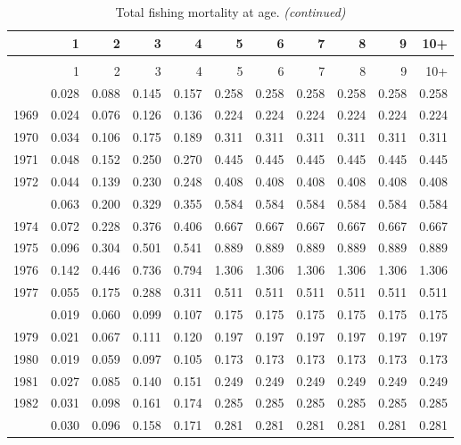 \documentclass[
]{article}
\begin{document}
\begin{longtable}[t]{lrrrrrrrrrr}
\caption{\label{tab:FAA-tot-table}Total fishing mortality at age.}\\
\toprule
  & 1 & 2 & 3 & 4 & 5 & 6 & 7 & 8 & 9 & 10+\\
\midrule
\endfirsthead
\caption[]{Total fishing mortality at age. \textit{(continued)}}\\
\toprule
  & 1 & 2 & 3 & 4 & 5 & 6 & 7 & 8 & 9 & 10+\\
\midrule
\endhead

\endfoot
\bottomrule
\endlastfoot
1968 & 0.028 & 0.088 & 0.145 & 0.157 & 0.258 & 0.258 & 0.258 & 0.258 & 0.258 & 0.258\\
1969 & 0.024 & 0.076 & 0.126 & 0.136 & 0.224 & 0.224 & 0.224 & 0.224 & 0.224 & 0.224\\
1970 & 0.034 & 0.106 & 0.175 & 0.189 & 0.311 & 0.311 & 0.311 & 0.311 & 0.311 & 0.311\\
1971 & 0.048 & 0.152 & 0.250 & 0.270 & 0.445 & 0.445 & 0.445 & 0.445 & 0.445 & 0.445\\
1972 & 0.044 & 0.139 & 0.230 & 0.248 & 0.408 & 0.408 & 0.408 & 0.408 & 0.408 & 0.408\\
\addlinespace
1973 & 0.063 & 0.200 & 0.329 & 0.355 & 0.584 & 0.584 & 0.584 & 0.584 & 0.584 & 0.584\\
1974 & 0.072 & 0.228 & 0.376 & 0.406 & 0.667 & 0.667 & 0.667 & 0.667 & 0.667 & 0.667\\
1975 & 0.096 & 0.304 & 0.501 & 0.541 & 0.889 & 0.889 & 0.889 & 0.889 & 0.889 & 0.889\\
1976 & 0.142 & 0.446 & 0.736 & 0.794 & 1.306 & 1.306 & 1.306 & 1.306 & 1.306 & 1.306\\
1977 & 0.055 & 0.175 & 0.288 & 0.311 & 0.511 & 0.511 & 0.511 & 0.511 & 0.511 & 0.511\\
\addlinespace
1978 & 0.019 & 0.060 & 0.099 & 0.107 & 0.175 & 0.175 & 0.175 & 0.175 & 0.175 & 0.175\\
1979 & 0.021 & 0.067 & 0.111 & 0.120 & 0.197 & 0.197 & 0.197 & 0.197 & 0.197 & 0.197\\
1980 & 0.019 & 0.059 & 0.097 & 0.105 & 0.173 & 0.173 & 0.173 & 0.173 & 0.173 & 0.173\\
1981 & 0.027 & 0.085 & 0.140 & 0.151 & 0.249 & 0.249 & 0.249 & 0.249 & 0.249 & 0.249\\
1982 & 0.031 & 0.098 & 0.161 & 0.174 & 0.285 & 0.285 & 0.285 & 0.285 & 0.285 & 0.285\\
\addlinespace
1983 & 0.030 & 0.096 & 0.158 & 0.171 & 0.281 & 0.281 & 0.281 & 0.281 & 0.281 & 0.281\\

\end{longtable}
\end{document}
